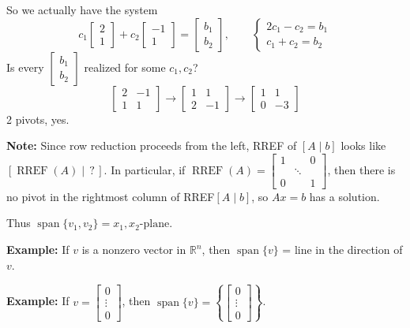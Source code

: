 \documentclass{article}
\begin{document}
\medskip

So we actually have the system
\[
c_1 \begin{bmatrix} 2 \\ 1 \end{bmatrix} + c_2 \begin{bmatrix} -1 \\ 1 \end{bmatrix} = \begin{bmatrix} b_1 \\ b_2 \end{bmatrix}, \qquad
\begin{cases} 2c_1 - c_2 = b_1 \\ c_1 + c_2 = b_2 \end{cases}
\]
Is every $\begin{bmatrix} b_1 \\ b_2 \end{bmatrix}$ realized for some $c_1, c_2$?
\[
\begin{bmatrix} 2 & -1 \\ 1 & 1 \end{bmatrix}
\to
\begin{bmatrix} 1 & 1 \\ 2 & -1 \end{bmatrix}
\to
\begin{bmatrix} 1 & 1 \\ 0 & -3 \end{bmatrix}
\]
2 pivots, yes.

\medskip

\textbf{Note:} Since row reduction proceeds from the left, RREF of $[A \mid b]$ looks like $[\operatorname{RREF}(A) \mid \, ? \, ]$. In particular, if $\operatorname{RREF}(A) = \begin{bmatrix} 1 & & 0 \\ & \ddots & \\ 0 & & 1 \end{bmatrix}$, then there is no pivot in the rightmost column of RREF$[A \mid b]$, so $Ax = b$ has a solution.

Thus $\operatorname{span}\{v_1, v_2\} = x_1, x_2\text{-plane}$.

\bigskip

\textbf{Example:} If $v$ is a nonzero vector in $\mathbb{R}^n$, then $\operatorname{span}\{v\}$ = line in the direction of $v$.

\bigskip

\textbf{Example:} If $v = \begin{bmatrix} 0 \\ \vdots \\ 0 \end{bmatrix}$, then $\operatorname{span}\{v\} = \left\{ \begin{bmatrix} 0 \\ \vdots \\ 0 \end{bmatrix} \right\}$.
\end{document}
